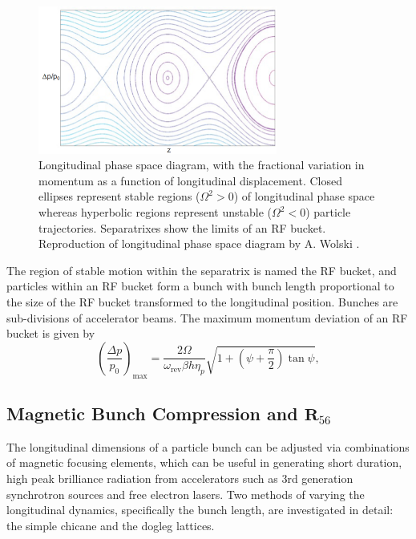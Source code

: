 \documentclass[../main.tex]{subfiles}
\begin{document}
\begin{figure}[!h]
\centering
\includegraphics[width=0.7\textwidth]{Figures/Energy_Recovery_Linac_Design/Longitudinal_Dynamics_fixed.pdf}
\caption{Longitudinal phase space diagram, with the fractional variation in momentum as a function of longitudinal displacement. Closed ellipses represent stable regions ($\Omega^{2}>0$) of longitudinal phase space whereas hyperbolic regions represent unstable ($\Omega^{2}<0$) particle trajectories. Separatrixes show the limits of an RF bucket. Reproduction of longitudinal phase space diagram by A. Wolski \cite{wolski2012longitudinal}.}
\label{fig:longitudinal_dynamics}
\end{figure}

The region of stable motion within the separatrix is named the RF bucket, and particles within an RF bucket form a bunch with bunch length proportional to the size of the RF bucket transformed to the longitudinal position. Bunches are sub-divisions of accelerator beams. The maximum momentum deviation of an RF bucket is given by \cite{wolski2012longitudinal}
\begin{equation}
\left(\frac{\Delta p}{p_{0}}\right)_{\mathrm{max}} = \frac{2\Omega}{\omega_{\mathrm{rev}}\beta h\eta_{p}}\sqrt{1+\left(\psi+\frac{\pi}{2}\right)\tan\psi},
\label{eq:RF_bucket_momentum_deviation}    
\end{equation}

\subsection{Magnetic Bunch Compression and $\boldsymbol{R}_{56}$}
\label{sec:magnetic_bunch_compression}

The longitudinal dimensions of a particle bunch can be adjusted via combinations of magnetic focusing elements, which can be useful in generating short duration, high peak brilliance radiation from accelerators such as 3rd generation synchrotron sources and free electron lasers. Two methods of varying the longitudinal dynamics, specifically the bunch length, are investigated in detail: the simple chicane and the dogleg lattices.
\end{document}
